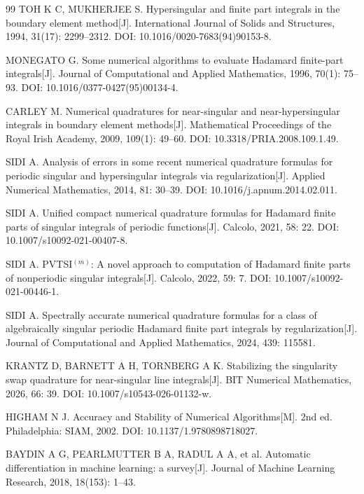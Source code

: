\documentclass[UTF8,fontset=none,10.5pt,a4paper]{ctexart}
\numberwithin{equation}{section}
\begin{document}
\begin{thebibliography}{99}
\small
{}
TOH K C, MUKHERJEE S. Hypersingular and finite part integrals in the boundary element method[J]. International Journal of Solids and Structures, 1994, 31(17): 2299--2312. DOI: 10.1016/0020-7683(94)90153-8.

MONEGATO G. Some numerical algorithms to evaluate Hadamard finite-part integrals[J]. Journal of Computational and Applied Mathematics, 1996, 70(1): 75--93. DOI: 10.1016/0377-0427(95)00134-4.

CARLEY M. Numerical quadratures for near-singular and near-hypersingular integrals in boundary element methods[J]. Mathematical Proceedings of the Royal Irish Academy, 2009, 109(1): 49--60. DOI: 10.3318/PRIA.2008.109.1.49.

SIDI A. Analysis of errors in some recent numerical quadrature formulas for periodic singular and hypersingular integrals via regularization[J]. Applied Numerical Mathematics, 2014, 81: 30--39. DOI: 10.1016/j.apnum.2014.02.011.

SIDI A. Unified compact numerical quadrature formulas for Hadamard finite parts of singular integrals of periodic functions[J]. Calcolo, 2021, 58: 22. DOI: 10.1007/s10092-021-00407-8.

SIDI A. PVTSI$^{(m)}$: A novel approach to computation of Hadamard finite parts of nonperiodic singular integrals[J]. Calcolo, 2022, 59: 7. DOI: 10.1007/s10092-021-00446-1.

SIDI A. Spectrally accurate numerical quadrature formulas for a class of algebraically singular periodic Hadamard finite part integrals by regularization[J]. Journal of Computational and Applied Mathematics, 2024, 439: 115581.

KRANTZ D, BARNETT A H, TORNBERG A K. Stabilizing the singularity swap quadrature for near-singular line integrals[J]. BIT Numerical Mathematics, 2026, 66: 39. DOI: 10.1007/s10543-026-01132-w.

HIGHAM N J. Accuracy and Stability of Numerical Algorithms[M]. 2nd ed. Philadelphia: SIAM, 2002. DOI: 10.1137/1.9780898718027.

BAYDIN A G, PEARLMUTTER B A, RADUL A A, et al. Automatic differentiation in machine learning: a survey[J]. Journal of Machine Learning Research, 2018, 18(153): 1--43.


\end{thebibliography}
\end{document}
